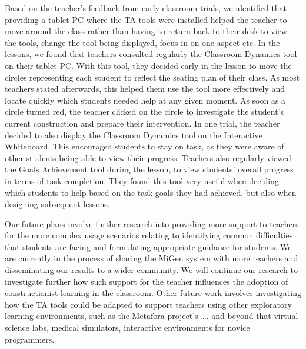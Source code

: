 Based on the teacher’s feedback from early classroom trials, we
identified that providing a tablet PC where the TA tools were
installed helped the teacher to move around the class rather than
having to return back to their desk to view the tools, change the tool
being displayed, focus in on one aspect etc. In the lessons, we found
that teachers consulted regularly the Classroom Dynamics tool on their
tablet PC. With this tool, they decided early in the lesson to move
the circles representing each student to reflect the seating plan of
their class. As most teachers stated afterwards, this helped them use
the tool more effectively and locate quickly which students needed
help at any given moment. As soon as a circle turned red, the teacher
clicked on the circle to investigate the student’s current
construction and prepare their intervention. In one trial, the teacher
decided to also display the Classroom Dynamics tool on the Interactive
Whiteboard. This encouraged students to stay on task, as they were
aware of other students being able to view their progress. Teachers
also regularly viewed the Goals Achievement tool during the lesson, to
view students’ overall progress in terms of task completion. They
found this tool very useful when deciding which students to help based
on the task goals they had achieved, but also when designing
subsequent lessons.

Our future plans involve further research into providing more support
to teachers for the more complex usage scenarios relating to
identifying common difficulties that students are facing and
formulating appropriate guidance for students. We are currently in the
process of sharing the MiGen system with more teachers and
disseminating our results to a wider community. We will continue our
research to investigate further how such support for the teacher
influences the adoption of constructionist learning in the
classroom. Other future work involves investigating how the TA tools
could be adapted to support teachers using other exploratory learning
environments, such as the Metafora project’s …. and beyond that
virtual science labs, medical simulators, interactive environments for
novice programmers.



